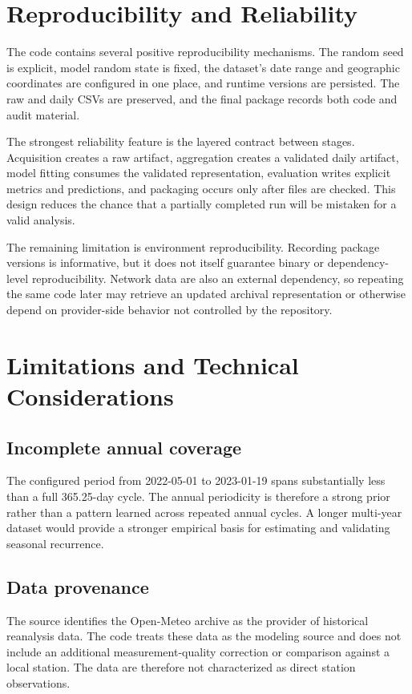 \documentclass[11pt,a4paper]{article}
\begin{document}
\section{Reproducibility and Reliability}
The code contains several positive reproducibility mechanisms. The random seed is explicit, model random state is fixed, the dataset's date range and geographic coordinates are configured in one place, and runtime versions are persisted. The raw and daily CSVs are preserved, and the final package records both code and audit material.

The strongest reliability feature is the layered contract between stages. Acquisition creates a raw artifact, aggregation creates a validated daily artifact, model fitting consumes the validated representation, evaluation writes explicit metrics and predictions, and packaging occurs only after files are checked. This design reduces the chance that a partially completed run will be mistaken for a valid analysis.

The remaining limitation is environment reproducibility. Recording package versions is informative, but it does not itself guarantee binary or dependency-level reproducibility. Network data are also an external dependency, so repeating the same code later may retrieve an updated archival representation or otherwise depend on provider-side behavior not controlled by the repository.

\section{Limitations and Technical Considerations}
\subsection{Incomplete annual coverage}
The configured period from 2022-05-01 to 2023-01-19 spans substantially less than a full 365.25-day cycle. The annual periodicity is therefore a strong prior rather than a pattern learned across repeated annual cycles. A longer multi-year dataset would provide a stronger empirical basis for estimating and validating seasonal recurrence.

\subsection{Data provenance}
The source identifies the Open-Meteo archive as the provider of historical reanalysis data. The code treats these data as the modeling source and does not include an additional measurement-quality correction or comparison against a local station. The data are therefore not characterized as direct station observations.
\end{document}
